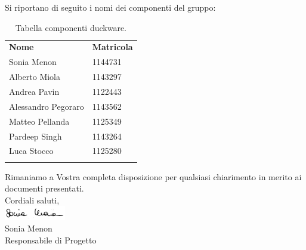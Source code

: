 \documentclass[a4paper,12pt]{article}
\begin{document}
Si riportano di seguito i nomi dei componenti del gruppo:
\begin{center}
	\renewcommand{\arraystretch}{1.5}
	\begin{longtable}{  p{4cm}  p{2cm}  }
		\rowcolor{tableHeadYellow}
		\textbf{Nome}   & \textbf{Matricola} \\
		Sonia Menon & 1144731\\
		Alberto Miola & 1143297\\
		Andrea Pavin & 1122443\\
		Alessandro Pegoraro & 1143562\\
		Matteo Pellanda & 1125349\\
		Pardeep Singh & 1143264\\
		Luca Stocco & 1125280\\
		\rowcolor{white}
		\caption{Tabella componenti duckware.}
	\end{longtable}
\end{center}
Rimaniamo a Vostra completa disposizione per qualsiasi chiarimento in merito ai documenti presentati.\\[1.5cm]
Cordiali saluti,\\
\includegraphics[width=0.2\textwidth]{../images/firme/firma_sonia.png}\\
Sonia Menon\\
Responsabile di Progetto
\vfill
\end{document}
